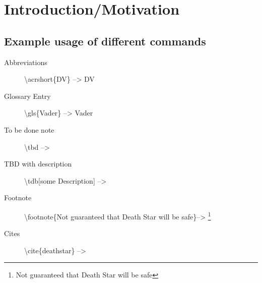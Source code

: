 \chapter{Introduction/Motivation}
\section{Example usage of different commands}


 \begin{description}
	\item[Abbreviations] \textbackslash acrshort\{DV\} -->  \acrshort{DV}
	\item[Glossary Entry] \textbackslash gls\{Vader\} -->  \gls{Vader}
	\item[To be done note] \textbackslash tbd --> \tbd
	\item[TBD with description] \textbackslash tdb[some Description] --> 
	\item[Footnote] \textbackslash footnote\{Not guaranteed that Death Star will be safe\}--> \footnote{Not guaranteed that Death Star will be safe}
	\item[Cites] \textbackslash cite\{deathstar\} --> \cite{deathstar}
 \end{description}



